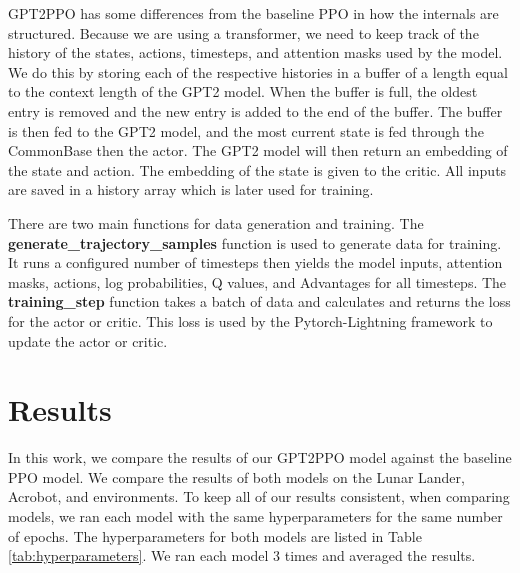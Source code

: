 GPT2PPO has some differences from the baseline PPO in how the internals are structured. Because we are using a transformer, we need to keep track of the history of the states, actions, timesteps, and attention masks used by the model. We do this by storing each of the respective histories in a buffer of a length equal to the context length of the GPT2 model. When the buffer is full, the oldest entry is removed and the new entry is added to the end of the buffer. The buffer is then fed to the GPT2 model, and the most current state is fed through the CommonBase then the actor. The GPT2 model will then return an embedding of the state and action. The embedding of the state is given to the critic. All inputs are saved in a history array which is later used for training.

There are two main functions for data generation and training. The \textbf{generate\_trajectory\_samples} function is used to generate data for training. It runs a configured number of timesteps then yields the model inputs, attention masks, actions, log probabilities, Q values, and Advantages for all timesteps. The \textbf{training\_step} function takes a batch of data and calculates and returns the loss for the actor or critic. This loss is used by the Pytorch-Lightning framework to update the actor or critic.




\section{Results}
\label{sec:results}

In this work, we compare the results of our GPT2PPO model against the baseline PPO model.
We compare the results of both models on the Lunar Lander, Acrobot, and environments.
To keep all of our results consistent, when comparing models, we ran each model with the
same hyperparameters for the same number of epochs.
The hyperparameters for both models are listed in Table \ref{tab:hyperparameters}.
We ran each model 3 times and averaged the results.

